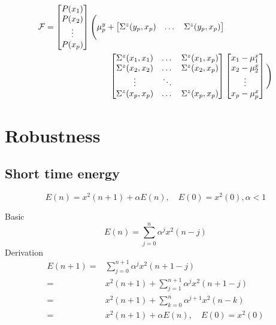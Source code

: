 \begin{equation}
	\begin{split}
		\mathcal F=\begin{bmatrix}
			P(x_1) \\
			P(x_2) \\
			\vdots \\
			P(x_p) \\
		\end{bmatrix}\Bigg(
			\mu_p^y + 
		\begin{bmatrix}
			\Sigma^z(y_p,x_p) & \dots & \Sigma^z(y_p,x_p)\\
		\end{bmatrix} & \\
		\begin{bmatrix}
			\Sigma^z(x_1,x_1) & \dots & \Sigma^z(x_1,x_p) \\
			\Sigma^z(x_2,x_2) & \dots & \Sigma^z(x_2,x_p)\\
			\vdots & \ddots & \\
			\Sigma^z(x_p,x_p) & \dots & \Sigma^z(x_p,x_p)\\
		\end{bmatrix} &
		\begin{bmatrix}
			x_1 - \mu_1^x \\
			x_2 - \mu_2^x \\
			\vdots \\
			x_p - \mu_p^x \\
		\end{bmatrix}\Bigg)
	\end{split}
\end{equation}





\section{Robustness} %
\label{sec:robustness}
\subsection{Short time energy} %
\label{sub:short_time_energy}
\begin{definition}
	\begin{equation}
		E(n) = x^2(n+1)+\alpha E(n), \quad E(0)=x^2(0),\alpha<1
	\end{equation}
\end{definition}
Basic \cite{rabiner78}
\begin{equation}
	E(n)=\sum_{j=0}^{n}\alpha^jx^2(n-j)
\end{equation}
Derivation
\begin{equation}
	\begin{split}
		E(n+1)=& \sum_{j=0}^{n+1}\alpha^jx^2(n+1-j)\\
		=& x^2(n+1)+\sum_{j=1}^{n+1}\alpha^jx^2(n+1-j)\\
		=& x^2(n+1)+\sum_{k=0}^{n}\alpha^{j+1} x^2(n-k)\\
		=& x^2(n+1)+\alpha E(n), \quad E(0)=x^2(0)\\
	\end{split}
\end{equation}

